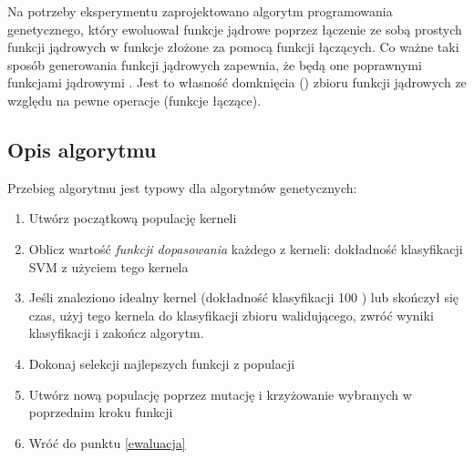 \documentclass{article}
\begin{document}
	Na potrzeby eksperymentu zaprojektowano algorytm programowania genetycznego, który ewoluował funkcje jądrowe poprzez łączenie ze sobą prostych funkcji jądrowych w funkcje złożone za pomocą funkcji łączących.
	Co ważne taki sposób generowania funkcji jądrowych zapewnia, że będą one poprawnymi funkcjami jądrowymi \cite{Shawe-Taylor:2004:KMP:975545}. Jest to własność domknięcia () zbioru funkcji jądrowych ze względu na pewne operacje (funkcje łączące).

\subsection{Opis algorytmu}
	Przebieg algorytmu jest typowy dla algorytmów genetycznych:
\begin{enumerate}
\item Utwórz początkową populację kerneli
\item \label{ewaluacja} Oblicz wartość \textit{funkcji dopasowania} każdego z kerneli: dokładność klasyfikacji SVM z użyciem tego kernela
\item Jeśli znaleziono idealny kernel (dokładność klasyfikacji 100 ) lub skończył się czas, użyj tego kernela do klasyfikacji zbioru walidującego, zwróć wyniki klasyfikacji i zakończ algorytm.
\item Dokonaj selekcji najlepszych funkcji z populacji
\item Utwórz nową populację poprzez mutację i krzyżowanie wybranych w poprzednim kroku funkcji
\item Wróć do punktu \ref{ewaluacja}
\end{enumerate}
\end{document}
